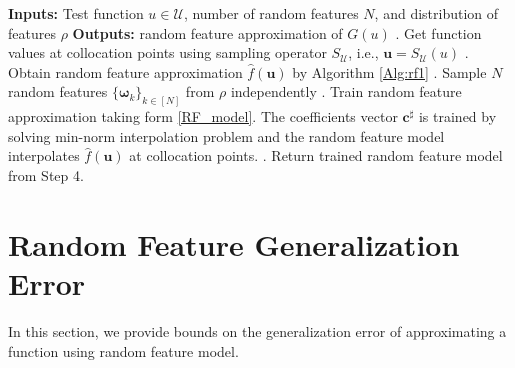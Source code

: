 \documentclass[11pt,twoside]{article}
\theoremstyle{plain}
\theoremstyle{definition}
\theoremstyle{remark}
\newcommand{\cb}{\mathbf{c}}
\newcommand{\ub}{\mathbf{u}}
\newcommand{\Uc}{\mathcal{U}}
\newcommand{\omegab}{\boldsymbol\omega}
\begin{document}
\begin{algorithm}
\caption{Random Feature Operator Learning - Inference}
\begin{algorithmic}
\State\textbf{Inputs:} Test function $u\in\Uc$, number of random features $N$, and distribution of features $\rho$
\State\textbf{Outputs:} random feature approximation of $G(u)$
. Get function values at collocation points using sampling operator $S_\Uc$, i.e., $\ub = S_\Uc(u)$
. Obtain random feature approximation $\hat{f}(\ub)$ by Algorithm \ref{Alg:rf1}
. Sample $N$ random features $\{ \omegab_k \}_{k\in[N]}$ from $\rho$ independently
. Train random feature approximation taking form \eqref{RF_model}. The coefficients vector $\cb^\sharp$ is trained by solving min-norm interpolation problem and the random feature model interpolates $\hat{f}(\ub)$ at collocation points.
. Return trained random feature model from Step 4.
\end{algorithmic}
\end{algorithm}



\section{Random Feature Generalization Error}
\label{Sec:RF}
In this section, we provide bounds on the generalization error of approximating a function using random feature model. 
\end{document}
